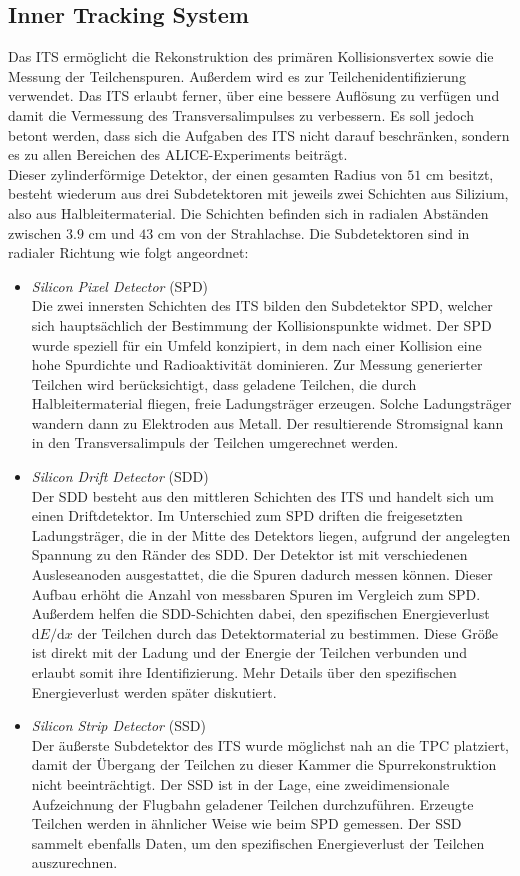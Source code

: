 \documentclass[12pt,a4paper]{report}
\begin{document}
\subsection{Inner Tracking System}
Das ITS ermöglicht die Rekonstruktion des primären Kollisionsvertex sowie die Messung der Teilchenspuren. Außerdem wird es zur Teilchenidentifizierung verwendet. Das ITS erlaubt ferner, über eine bessere Auflösung zu verfügen und damit die Vermessung des Transversalimpulses zu verbessern. Es soll jedoch betont werden, dass sich die Aufgaben des ITS nicht darauf beschränken, sondern es zu allen Bereichen des ALICE-Experiments beiträgt.\\
Dieser zylinderförmige Detektor, der einen gesamten Radius von $51$ cm besitzt, besteht wiederum aus drei Subdetektoren mit jeweils zwei Schichten aus Silizium, also aus Halbleitermaterial. Die Schichten befinden sich in radialen Abständen zwischen $3.9$ cm und $43$ cm von der Strahlachse. Die Subdetektoren sind in radialer Richtung wie folgt angeordnet: 
\begin{itemize}
\item \textit{Silicon Pixel Detector} (SPD)\\
Die zwei innersten Schichten des ITS bilden den Subdetektor SPD, welcher sich hauptsächlich der Bestimmung der Kollisionspunkte widmet. Der SPD wurde speziell für ein Umfeld konzipiert, in dem nach einer Kollision eine hohe Spurdichte und Radioaktivität dominieren. Zur Messung generierter Teilchen wird berücksichtigt, dass geladene Teilchen, die durch Halbleitermaterial fliegen, freie Ladungsträger erzeugen. Solche Ladungsträger wandern dann zu Elektroden aus Metall. Der resultierende Stromsignal kann in den Transversalimpuls der Teilchen umgerechnet werden. 
\item \textit{Silicon Drift Detector} (SDD)\\
Der SDD besteht aus den mittleren Schichten des ITS und handelt sich um einen Driftdetektor. Im Unterschied zum SPD driften die freigesetzten Ladungsträger, die in der Mitte des Detektors liegen, aufgrund der angelegten Spannung zu den Ränder des SDD. Der Detektor ist mit verschiedenen Ausleseanoden ausgestattet, die die Spuren dadurch messen können. Dieser Aufbau erhöht die Anzahl von messbaren Spuren im Vergleich zum SPD. Außerdem helfen die SDD-Schichten dabei, den spezifischen Energieverlust $\mathrm{d}E/\mathrm{d}x$ der Teilchen durch das Detektormaterial zu bestimmen. Diese Größe ist direkt mit der Ladung und der Energie der Teilchen verbunden und erlaubt somit ihre Identifizierung. Mehr Details über den spezifischen Energieverlust werden später diskutiert.
\item \textit{Silicon Strip Detector} (SSD)\\
Der äußerste Subdetektor des ITS wurde möglichst nah an die TPC platziert, damit der Übergang der Teilchen zu dieser Kammer die Spurrekonstruktion nicht beeinträchtigt. Der SSD ist in der Lage, eine zweidimensionale Aufzeichnung der Flugbahn geladener Teilchen durchzuführen. Erzeugte Teilchen werden in ähnlicher Weise wie beim SPD gemessen. Der SSD sammelt ebenfalls Daten, um den spezifischen Energieverlust der Teilchen auszurechnen. 
\end{itemize}
\end{document}
